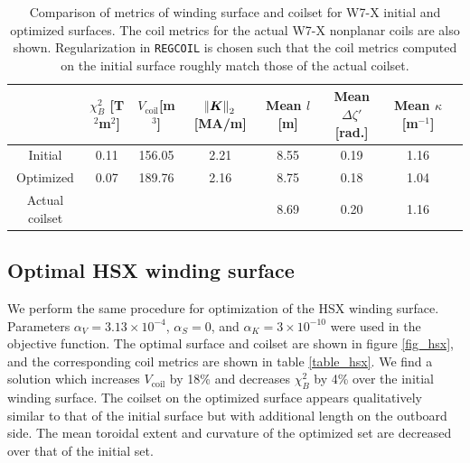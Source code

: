 \documentclass[aps,unsortedaddress]{revtex4-1}
\begin{document}
\begin{table}
\renewcommand{\arraystretch}{1.4}
\begin{tabular} {| c | c | c | c | c | c | c | c |}
\hline
& $\chi^2_B$ [T$^2$m$^2$] & $V_{\text{coil}}$[m$^3$] & $\norm{\bm{K}}_2$ [MA/m] & Mean $l$ [m] & Mean $\Delta \zeta'$ [rad.] & Mean $\kappa$ [m$^{-1}$]  \\ \hline 
Initial & 0.11 & 156.05 & 2.21 & 8.55 & 0.19 & 1.16 \\ \hline
Optimized & 0.07 & 189.76 & 2.16 & 8.75 & 0.18 & 1.04   \\ \hline
Actual coilset & & & & 8.69 & 0.20 & 1.16  \\ \hline
\end{tabular}
\caption{Comparison of metrics of winding surface and coilset for W7-X initial and optimized surfaces. The coil metrics for the actual W7-X nonplanar coils are also shown. Regularization in \texttt{REGCOIL} is chosen such that the coil metrics computed on the initial surface roughly match those of the actual coilset.}
\label{table_w7x}
\end{table}

\FloatBarrier
\subsection{Optimal HSX winding surface}
\FloatBarrier

We perform the same procedure for optimization of the HSX winding surface. Parameters $\alpha_V = 3.13\times10^{-4}$, $\alpha_S = 0$, and $\alpha_K = 3\times 10^{-10}$ were used in the objective function. The optimal surface and coilset are shown in figure \ref{fig_hsx}, and the corresponding coil metrics are shown in table \ref{table_hsx}. We find a solution which increases $V_{\text{coil}}$ by 18\% and decreases $\chi^2_B$ by 4\% over the initial winding surface. The coilset on the optimized surface appears qualitatively similar to that of the initial surface but with additional length on the outboard side. The mean toroidal extent and curvature of the optimized set are decreased over that of the initial set. 
\end{document}
